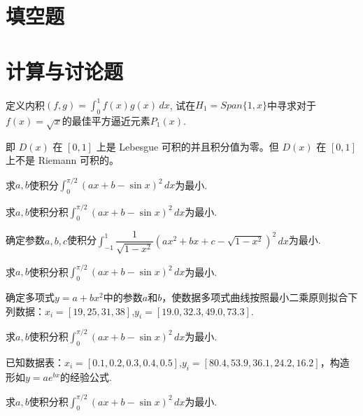 \documentclass[lang=cn,newtx,12pt,scheme=chinese]{elegantbook}
\begin{document}
\section{填空题}
\section{计算与讨论题}
\begin{exercise}
	定义内积$(f,g)=\int_{0}^{1} f(x)g(x) \, dx$, 试在$H_1=Span\{1,x\}$中寻求对于$f(x)=\sqrt{x}$的最佳平方逼近元素$P_1(x)$. 
\end{exercise}

\begin{solution}
	即 $D(x)$ 在 $[0,1]$ 上是 Lebesgue 可积的并且积分值为零。但 $D(x)$ 在 $[0,1]$ 上不是 Riemann 可积的。
\end{solution}
\begin{exercise}
求$a,b$使积分$\int_{0}^{\pi/2}(ax+b-\sin x)^2 \, dx$为最小.
\end{exercise}

\begin{solution}
	求$a,b$使积分积$\int_{0}^{\pi/2}(ax+b-\sin x)^2 \, dx$为最小.
\end{solution}
\begin{exercise}
	确定参数$a,b,c$使积分$\int_{-1}^{1}\dfrac{1}{\sqrt{1-x^2}}(ax^2+bx+c-\sqrt{1-x^2})^2 \, dx$为最小.
\end{exercise}

\begin{solution}
	求$a,b$使积分积$\int_{0}^{\pi/2}(ax+b-\sin x)^2 \, dx$为最小.
\end{solution}

\begin{exercise}
	确定多项式$y=a+bx^2$中的参数$a$和$b$，使数据多项式曲线按照最小二乘原则拟合下列数据：$x_i=[19,25,31,38]$,$y_i=[19.0,32.3,49.0,73.3]$.
\end{exercise}

\begin{solution}
	求$a,b$使积分积$\int_{0}^{\pi/2}(ax+b-\sin x)^2 \, dx$为最小.
\end{solution}
\begin{exercise}
	已知数据表：$x_i=[0.1,0.2,0.3,0.4,0.5]$,$y_i=[80.4,53.9,36.1,24.2,16.2]$，构造形如$y=ae^{bx}$的经验公式.
\end{exercise}

\begin{solution}
	求$a,b$使积分积$\int_{0}^{\pi/2}(ax+b-\sin x)^2 \, dx$为最小.
\end{solution}
\end{document}
